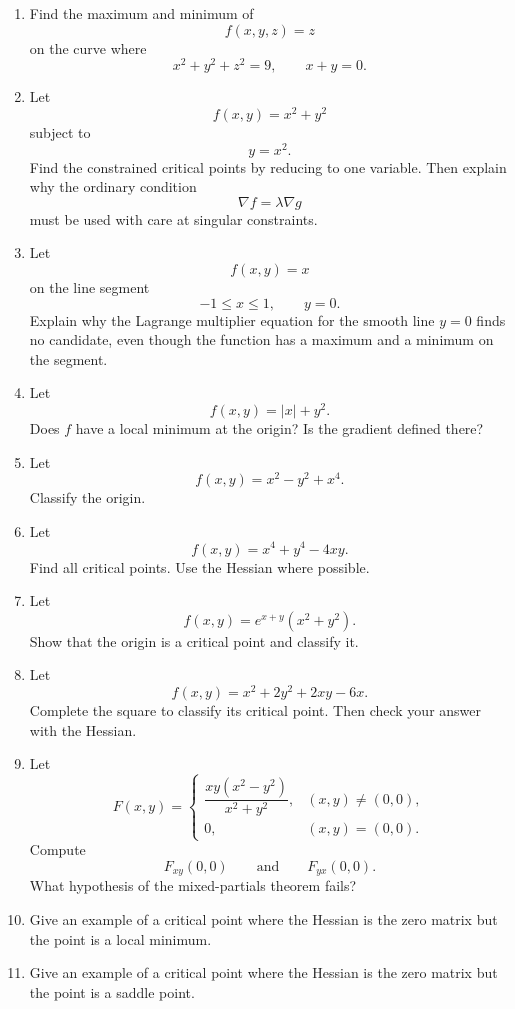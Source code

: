 \begin{enumerate}
\item Find the maximum and minimum of
\[
    f(x,y,z)=z
\]
on the curve where
\[
    x^2+y^2+z^2=9,
    \qquad
    x+y=0.
\]

\item Let
\[
    f(x,y)=x^2+y^2
\]
subject to
\[
    y=x^2.
\]
Find the constrained critical points by reducing to one variable.  Then explain why the
ordinary condition
\[
    \nabla f=\lambda\nabla g
\]
must be used with care at singular constraints.

\item Let
\[
    f(x,y)=x
\]
on the line segment
\[
    -1\le x\le1,
    \qquad
    y=0.
\]
Explain why the Lagrange multiplier equation for the smooth line \(y=0\) finds no
candidate, even though the function has a maximum and a minimum on the segment.

\item Let
\[
    f(x,y)=|x|+y^2.
\]
Does \(f\) have a local minimum at the origin?  Is the gradient defined there?

\item Let
\[
    f(x,y)=x^2-y^2+x^4.
\]
Classify the origin.

\item Let
\[
    f(x,y)=x^4+y^4-4xy.
\]
Find all critical points.  Use the Hessian where possible.

\item Let
\[
    f(x,y)=e^{x+y}(x^2+y^2).
\]
Show that the origin is a critical point and classify it.

\item Let
\[
    f(x,y)=x^2+2y^2+2xy-6x.
\]
Complete the square to classify its critical point.  Then check your answer with the
Hessian.

\item Let
\[
    F(x,y)=
    \begin{cases}
    \dfrac{xy(x^2-y^2)}{x^2+y^2}, & (x,y)\ne(0,0),\\[3mm]
    0, & (x,y)=(0,0).
    \end{cases}
\]
Compute
\[
    F_{xy}(0,0)
    \qquad\text{and}\qquad
    F_{yx}(0,0).
\]
What hypothesis of the mixed-partials theorem fails?

\item Give an example of a critical point where the Hessian is the zero matrix but the
point is a local minimum.

\item Give an example of a critical point where the Hessian is the zero matrix but the
point is a saddle point.
\end{enumerate}

